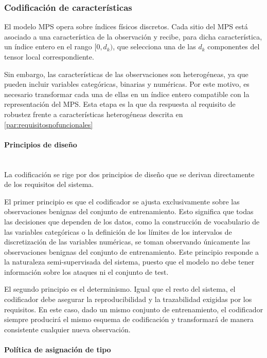 \documentclass[12pt]{extarticle}
\numberwithin{equation}{section}
\begin{document}
\begin{refsection}
\subsubsection{Codificación de características}
\label{subsubsec:codificacioncaracteristicas}

El modelo MPS opera sobre índices físicos discretos. Cada sitio del MPS está asociado a una característica de la observación y recibe, para dicha característica, un índice entero en el rango $[0, d_k)$, que selecciona una de las $d_k$ componentes del tensor local correspondiente.

Sin embargo, las características de las observaciones son heterogéneas, ya que pueden incluir variables categóricas, binarias y numéricas. Por este motivo, es necesario transformar cada una de ellas en un índice entero compatible con la representación del MPS. Esta etapa es la que da respuesta al requisito de robustez frente a características heterogéneas descrita en \ref{par:requisitosnofuncionales}

\paragraph{Principios de diseño}
\label{par:principiosdiseno}
\mbox{}\\

La codificación se rige por dos principios de diseño que se derivan directamente de los requisitos del sistema.

El primer principio es que el codificador se ajusta exclusivamente sobre las observaciones benignas del conjunto de entrenamiento. Esto significa que todas las decisiones que dependen de los datos, como la construcción de vocabulario de las variables categóricas o la definición de los límites de los intervalos de discretización de las variables numéricas, se toman observando únicamente las observaciones benignas del conjunto de entrenamiento. Este principio responde a la naturaleza semi-supervisada del sistema, puesto que el modelo no debe tener información sobre los ataques ni el conjunto de test.

El segundo principio es el determinismo. Igual que el resto del sistema, el codificador debe asegurar la reproducibilidad y la trazabilidad exigidas por los requisitos. En este caso, dado un mismo conjunto de entrenamiento, el codificador siempre producirá el mismo esquema de codificación y transformará de manera consistente cualquier nueva observación.

\paragraph{Política de asignación de tipo}
\label{par:politicaasignaciontipo}
\mbox{}\\


\end{refsection}
\end{document}
